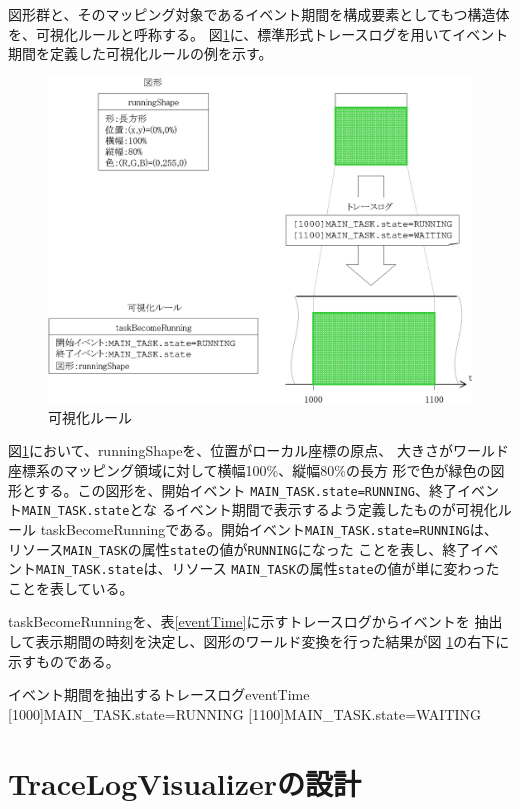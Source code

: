 図形群と、そのマッピング対象であるイベント期間を構成要素としてもつ構造体を、可視化ルールと呼称する。
図\ref{fig:timeShape}に、標準形式トレースログを用いてイベント期間を定義した可視化ルールの例を示す。
\begin{figure}[tb]
\begin{center}
\includegraphics[scale=0.9]{timeShape.eps}
\caption{可視化ルール}
\label{fig:timeShape}
\end{center}
\end{figure}
図\ref{fig:timeShape}において、runningShapeを、位置がローカル座標の原点、
大きさがワールド座標系のマッピング領域に対して横幅100\%、縦幅80\%の長方
形で色が緑色の図形とする。この図形を、開始イベント
\verb|MAIN_TASK.state=RUNNING|、終了イベント\verb|MAIN_TASK.state|とな
るイベント期間で表示するよう定義したものが可視化ルール
taskBecomeRunningである。開始イベント\verb|MAIN_TASK.state=RUNNING|は、
リソース\verb|MAIN_TASK|の属性\verb|state|の値が\verb|RUNNING|になった
ことを表し、終了イベント\verb|MAIN_TASK.state|は、リソース
\verb|MAIN_TASK|の属性\verb|state|の値が単に変わったことを表している。

taskBecomeRunningを、表\ref{eventTime}に示すトレースログからイベントを
抽出して表示期間の時刻を決定し、図形のワールド変換を行った結果が図
\ref{fig:timeShape}の右下に示すものである。

\begin{File}{イベント期間を抽出するトレースログ}{eventTime}
[1000]MAIN_TASK.state=RUNNING
[1100]MAIN_TASK.state=WAITING
\end{File}

\section{TraceLogVisualizerの設計}

